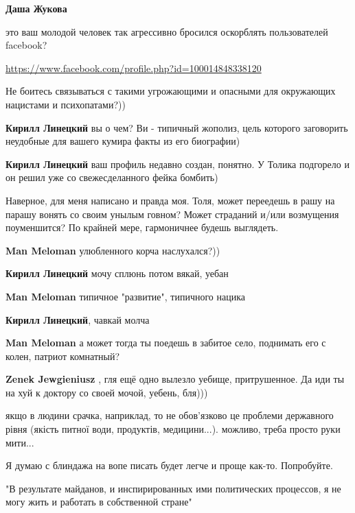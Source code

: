 \begin{itemize}
\begin{itemize}
\textbf{Даша Жукова} 

это ваш молодой человек так агрессивно бросился оскорблять пользователей facebook? 

\url{https://www.facebook.com/profile.php?id=100014848338120}

Не боитесь связываться с такими угрожающими и опасными для окружающих нацистами
и психопатами?))

\textbf{Кирилл Линецкий} вы о чем? Ви - типичный жополиз, цель которого заговорить неудобные для вашего кумира факты из его биографии)

\textbf{Кирилл Линецкий} ваш профиль недавно создан, понятно. У Толика подгорело и он решил уже со свежесделанного фейка бомбить)
\end{itemize} %


Наверное, для меня написано и правда моя. Толя, может переедешь в рашу на
парашу вонять со своим унылым говном? Может страданий и/или возмущения
поуменшится? По крайней мере, гармоничнее будешь выглядеть.

\begin{itemize} %
\textbf{Man Meloman} улюбленного корча наслухался?))

\textbf{Кирилл Линецкий} мочу сплюнь потом вякай, уебан

\textbf{Man Meloman} типичное "развитие", типичного нацика

\textbf{Кирилл Линецкий}, чавкай молча

\textbf{Man Meloman} а может тогда ты поедешь в забитое село, поднимать его с колен, патриот комнатный?

\textbf{Zenek Jewgieniusz} , гля ещё одно вылезло уебище, притрушенное. Да иди ты на хуй к доктору со своей мочой, уебень, бля)))
\end{itemize} %


якщо в людини срачка, наприклад, то не обов’язково це проблеми державного рівня
(якість питної води, продуктів, медицини...). можливо, треба просто руки мити...

Я думаю с блиндажа на вопе писать будет легче и проще как-то. Попробуйте.


"В результате майданов, и инспирированных ими политических процессов, я не могу
жить и работать в собственной стране"


\end{itemize}
